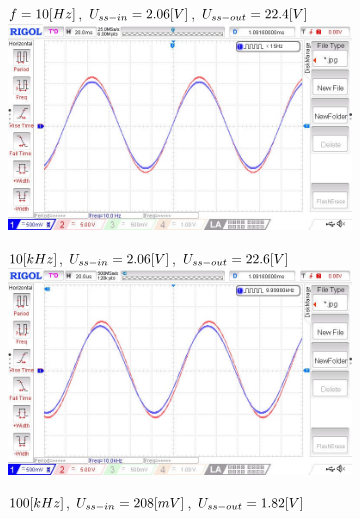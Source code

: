 \documentclass{article}
\begin{document}
\begin{figure}[H]
  \begin{figure}[H]
    \begin{minipage}[t]{0.49\textwidth}
      \(f = 10\-[Hz]\), \(U_{ss-in} = 2.06\-[V]\), \(U_{ss-out} = 22.4\-[V]\)\\
      \includegraphics[width=\textwidth]{LAB/NewFile14.jpg}
    \end{minipage}
    \hfill
    \begin{minipage}[t]{0.49\textwidth}
      \(10\-[kHz]\), \(U_{ss-in} = 2.06\-[V]\), \(U_{ss-out} = 22.6\-[V]\)\\
      \includegraphics[width=\textwidth]{LAB/NewFile15.jpg}
    \end{minipage}
    \vspace{-4mm}
  \end{figure}
  \begin{figure}[H]
    \begin{minipage}[t]{0.49\textwidth}
      \(100\-[kHz]\), \(U_{ss-in} = 208\-[mV]\), \(U_{ss-out} = 1.82\-[V]\)\\

\end{minipage}
\end{figure}
\end{figure}
\end{document}
